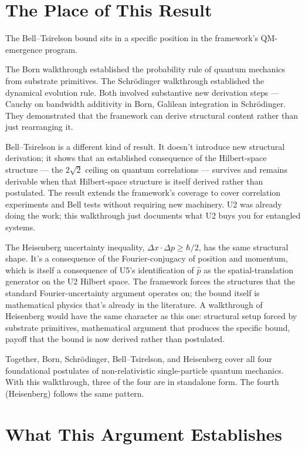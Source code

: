 \documentclass[11pt,a4paper]{article}
\begin{document}
\section{The Place of This Result}

The Bell--Tsirelson bound sits in a specific position in the framework's QM-emergence program.

The Born walkthrough established the probability rule of quantum mechanics from substrate primitives. The Schr\"odinger walkthrough established the dynamical evolution rule. Both involved substantive new derivation steps --- Cauchy on bandwidth additivity in Born, Galilean integration in Schr\"odinger. They demonstrated that the framework can derive structural content rather than just rearranging it.

Bell--Tsirelson is a different kind of result. It doesn't introduce new structural derivation; it shows that an established consequence of the Hilbert-space structure --- the $2\sqrt{2}$ ceiling on quantum correlations --- survives and remains derivable when that Hilbert-space structure is itself derived rather than postulated. The result extends the framework's coverage to cover correlation experiments and Bell tests without requiring new machinery. U2 was already doing the work; this walkthrough just documents what U2 buys you for entangled systems.

The Heisenberg uncertainty inequality, $\Delta x \cdot \Delta p \geq \hbar/2$, has the same structural shape. It's a consequence of the Fourier-conjugacy of position and momentum, which is itself a consequence of U5's identification of $\hat{p}$ as the spatial-translation generator on the U2 Hilbert space. The framework forces the structures that the standard Fourier-uncertainty argument operates on; the bound itself is mathematical physics that's already in the literature. A walkthrough of Heisenberg would have the same character as this one: structural setup forced by substrate primitives, mathematical argument that produces the specific bound, payoff that the bound is now derived rather than postulated.

Together, Born, Schr\"odinger, Bell--Tsirelson, and Heisenberg cover all four foundational postulates of non-relativistic single-particle quantum mechanics. With this walkthrough, three of the four are in standalone form. The fourth (Heisenberg) follows the same pattern.

\section{What This Argument Establishes}
\end{document}

